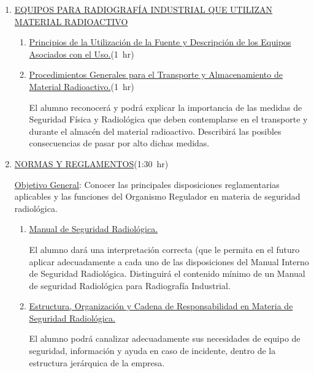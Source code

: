 \documentclass[11pt, oneside]{book}
\begin{document}
\begin{enumerate}
\begin{enumerate}[label*=\arabic*.]
      \item \ul{La Protecci\'on Radiol\'ogica Durante el Trabajo} \hfill\mbox{(1 hr)}

        Identificara las situaciones de mayor riesgo durante el trabajo radiográfico.
        Describirá secuencialmente las medidas de protección que debe tomarse en
        una jornada de trabajo.
    \end{enumerate}

  \item \ul{EQUIPOS PARA RADIOGRAF\'IA INDUSTRIAL QUE UTILIZAN MATERIAL RADIOACTIVO}
    \begin{enumerate}[label*=\arabic*.]
      \item \ul{Principios de la Utilizaci\'on de la Fuente y Descripci\'on de los Equipos Asociados con el Uso.}\hfill\mbox{(1 hr)}

      \item \ul{Procedimientos Generales para el Transporte y Almacenamiento de Material Radioactivo.}\hfill\mbox{(1 hr)}

        El alumno reconocerá y podrá explicar la importancia de las medidas de Seguridad Física
        y Radiológica que deben contemplarse en el transporte y durante el almacén del material radioactivo.
        Describirá las posibles consecuencias de pasar por alto dichas medidas.
    \end{enumerate}
  \item \ul{NORMAS Y REGLAMENTOS}\hfill\mbox{(1:30 hr)}

    \ul{Objetivo General}: Conocer las principales disposiciones reglamentarias aplicables y las funciones del Organismo Regulador en
    materia de seguridad radiológica.
    \begin{enumerate}[label*=\arabic*.]
      \item \ul{Manual de Seguridad Radiol\'ogica.}

        El alumno dará una interpretación correcta (que le permita en el futuro aplicar adecuadamente
        a cada uno de las disposiciones del Manual Interno de Seguridad Radiológica. Distinguirá el contenido mínimo de un Manual
        de seguridad Radiológica para Radiografía Industrial.
      \item \ul{Estructura, Organizaci\'on y Cadena de Responsabilidad en Materia de Seguridad Radiol\'ogica.}

        El alumno podrá canalizar adecuadamente sus necesidades de equipo de seguridad,
        información y ayuda en caso de incidente, dentro de la estructura jerárquica de la empresa.


\end{enumerate}
\end{enumerate}
\end{document}
